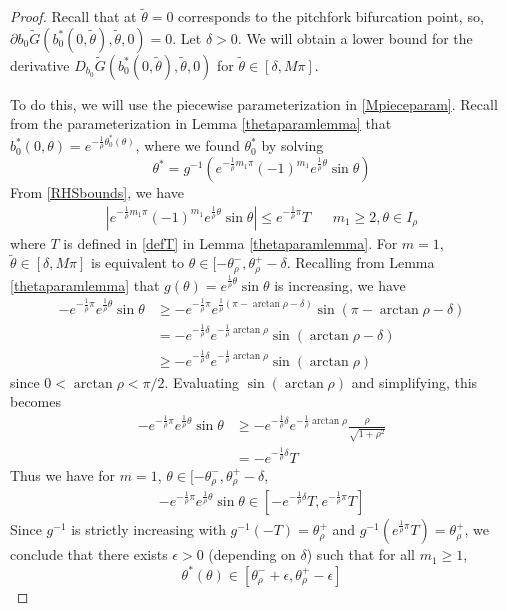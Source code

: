 \documentclass[thesis.tex]{subfiles}
\begin{document}
\begin{lemma}
\begin{proof}
Recall that at $\tilde{\theta} = 0$ corresponds to the pitchfork bifurcation point, so, $\partial b_0 \tilde{G}(b_0^*(0, \tilde{\theta}), \tilde{\theta}, 0) = 0$. Let $\delta > 0$. We will obtain a lower bound for the derivative $D_{b_0} \tilde{G}(b_0^*(0, \tilde{\theta}), \tilde{\theta}, 0)$ for $\tilde{\theta} \in [\delta, M \pi]$. 

To do this, we will use the piecewise parameterization in \eqref{Mpieceparam}.
Recall from the parameterization in Lemma \ref{thetaparamlemma} that $b_0^*(0, \theta) = e^{-\frac{1}{\rho}\theta_0^*(\theta)}$, where we found $\theta_0^*$ by solving
\begin{equation*}
\theta^* = g^{-1}\left( e^{ -\frac{1}{\rho} m_1 \pi } (-1)^{m_1}  e^{ \frac{1}{\rho} \theta } \sin \theta \right)
\end{equation*}
From \eqref{RHSbounds}, we have 
\begin{align*}
|e^{ -\frac{1}{\rho} m_1 \pi } (-1)^{m_1}  e^{ \frac{1}{\rho} \theta } \sin \theta| \leq e^{ -\frac{1}{\rho} \pi } T && m_1 \geq 2, \theta \in I_\rho
\end{align*}
where $T$ is defined in \eqref{defT} in Lemma \ref{thetaparamlemma}. 
For $m = 1$, $\tilde{\theta} \in [\delta, M \pi]$ is equivalent to $\theta \in [-\theta_\rho^-, \theta_\rho^+ - \delta$. Recalling from Lemma \ref{thetaparamlemma} that $g(\theta) = e^{ \frac{1}{\rho} \theta } \sin \theta$ is increasing, we have
\begin{align*}
-e^{ -\frac{1}{\rho} \pi } e^{ \frac{1}{\rho} \theta } \sin \theta &\geq 
 -e^{ -\frac{1}{\rho} \pi } e^{ \frac{1}{\rho}(\pi - \arctan \rho - \delta) } \sin(\pi - \arctan \rho - \delta) \\
&= -e^{-\frac{1}{\rho}\delta} e^{-\frac{1}{\rho}\arctan\rho}\sin(\arctan \rho - \delta) \\
&\geq -e^{-\frac{1}{\rho}\delta} e^{-\frac{1}{\rho}\arctan\rho}\sin(\arctan \rho)
\end{align*}
since $0 < \arctan \rho < \pi/2$. Evaluating $\sin(\arctan\rho)$ and simplifying, this becomes
\begin{align*}
-e^{ -\frac{1}{\rho} \pi } e^{ \frac{1}{\rho} \theta } \sin \theta 
&\geq -e^{-\frac{1}{\rho}\delta} e^{-\frac{1}{\rho}\arctan\rho}\frac{\rho}{\sqrt{1 + \rho^2}} \\
&= -e^{-\frac{1}{\rho}\delta} T
\end{align*}
Thus we have for $m = 1$, $\theta \in [-\theta_\rho^-, \theta_\rho^+ - \delta$,
\begin{align*}
-e^{ -\frac{1}{\rho} \pi } e^{ \frac{1}{\rho} \theta } \sin \theta
\in [-e^{-\frac{1}{\rho}\delta} T, e^{ -\frac{1}{\rho} \pi } T]
\end{align*}
Since $g^{-1}$ is strictly increasing with $g^{-1}(-T) = \theta_\rho^+$ and $g^{-1}(e^{\frac{1}{\rho}\pi}T) = \theta_\rho^+$, we conclude that there exists $\epsilon > 0$ (depending on $\delta$) such that for all $m_1 \geq 1$, 
\[
\theta^*(\theta) \in [\theta_\rho^- + \epsilon, \theta_\rho^+ - \epsilon]
\]


\end{proof}
\end{lemma}
\end{document}
